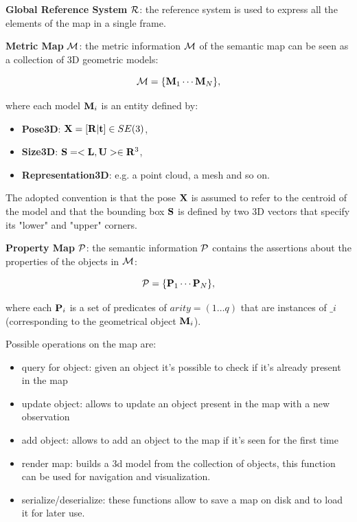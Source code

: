 \documentclass{article}
\begin{document}
	\begin{description}
		\item {\bf Global Reference System} $\mathcal{R}$: the reference system is used to express all the elements of the map in a single frame.
		\item {\bf Metric Map} $\mathcal{M}$: the metric information $\mathcal{M}$ of the semantic map can be seen as a collection of 3D geometric models:
		
		\begin{equation}
		\mathcal{M} = \{\mathbf{M}_1 \cdots \mathbf{M}_N\},
		\end{equation}
		
		\noindent	
		where each model $\mathbf{M}_i$ is an entity defined by:
		
		\begin{itemize}
			\item {\bf Pose3D}: $\mathbf{X} = [ \mathbf{R} | \mathbf{t}] \in SE(3)$,
			\item {\bf Size3D}: $\mathbf{S} = <\mathbf{L} ,\mathbf{U}> \in \mathbf{R}^3 $,
			\item {\bf Representation3D}: e.g. a point cloud, a mesh and so on.
		\end{itemize}
		
		The adopted convention is that the pose $\mathbf{X}$ is assumed to refer to the centroid of the model and that the bounding box $\mathbf{S}$ is defined by two 3D vectors that specify its "lower" and "upper" corners.
		\item {\bf Property Map} $\mathcal{P}$: the semantic information $\mathcal{P}$ contains the assertions about the properties of the objects in $\mathcal{M}$:
		
		\begin{equation}
		\mathcal{P} = \{\mathbf{P}_1 \cdots \mathbf{P}_N\},
		\end{equation}
		
		\noindent
		where each $\mathbf{P}_i$ is a set of predicates of $arity = (1 \dots q)$ that are instances of $\bm_i$ (corresponding to the geometrical object $\mathbf{M}_i$).
	\end{description}	

	\noindent
	Possible operations on the map are:
	
	\begin{itemize}
		\item query for object: given an object it's possible to check if it's already present in the map
		\item update object: allows to update an object present in the map with a new observation
		\item add object: allows to add an object to the map if it's seen for the first time
		\item render map: builds a 3d model from the collection of objects, this function can be used for navigation and visualization.
		\item serialize/deserialize: these functions allow to save a map on disk and to load it for later use.
	\end{itemize}
			
\end{document}
